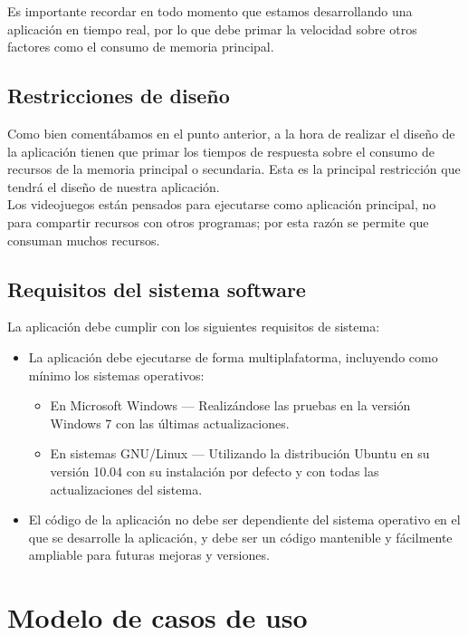 Es importante recordar en todo momento que estamos desarrollando una aplicación en tiempo real, por lo que
debe primar la velocidad sobre otros factores como el consumo de memoria principal.


\subsection{Restricciones de diseño}
Como bien comentábamos en el punto anterior, a la hora de realizar el diseño de la aplicación tienen que
primar los tiempos de respuesta sobre el consumo de recursos de la memoria principal o secundaria. Esta
es la principal restricción que tendrá el diseño de nuestra aplicación.\\

Los videojuegos están pensados para ejecutarse como aplicación principal, no para compartir recursos
con otros programas; por esta razón se permite que consuman muchos recursos.


\subsection{Requisitos del sistema software}

La aplicación debe cumplir con los siguientes requisitos de sistema:
\begin{itemize}
    \item La aplicación debe ejecutarse de forma multiplafatorma, incluyendo como mínimo los sistemas operativos:
        \begin{itemize}
            \item En Microsoft Windows --- Realizándose las pruebas en la versión Windows 7 con las últimas actualizaciones.
            \item En sistemas GNU/Linux --- Utilizando la distribución Ubuntu en su versión 10.04 con su instalación
                    por defecto y con todas las actualizaciones del sistema.
        \end{itemize}
    \item El código de la aplicación no debe ser dependiente del sistema operativo en el que se desarrolle la aplicación,
            y debe ser un código mantenible y fácilmente ampliable para futuras mejoras y versiones.
\end{itemize}

\section{Modelo de casos de uso}

